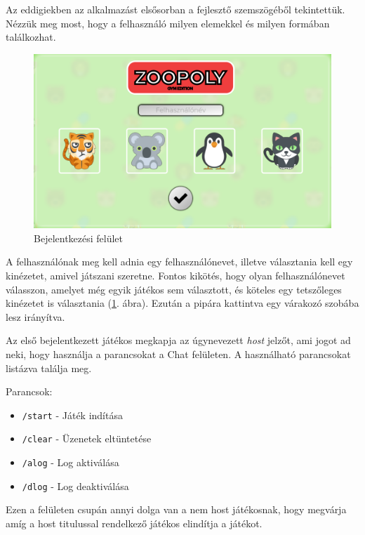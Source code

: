 
Az eddigiekben az alkalmazást elsősorban a fejlesztő szemszögéből tekintettük. Nézzük meg most, hogy a felhasználó milyen elemekkel és milyen formában találkozhat.


\begin{figure}[h!]
\centering
\includegraphics[width=\textwidth]{images/a5187162fb81495697aab2f5f49d6bd0.png}
\caption{Bejelentkezési felület}
\label{fig:login}
\end{figure}

A felhasználónak meg kell adnia egy felhasználónevet, illetve választania kell egy kinézetet, amivel játszani szeretne. Fontos kikötés, hogy olyan felhasználónevet válasszon, amelyet még egyik játékos sem választott, és köteles egy tetszőleges kinézetet is választania (\ref{fig:login}. ábra). Ezután a pipára kattintva egy várakozó szobába lesz irányítva.


Az első bejelentkezett játékos megkapja az úgynevezett \textit{host} jelzőt, ami jogot ad neki, hogy használja a parancsokat a Chat felületen. A használható parancsokat listázva találja meg.

Parancsok:
\begin{itemize}
	\item \texttt{/start} - Játék indítása
	\item \texttt{/clear} - Üzenetek eltüntetése
	\item \texttt{/alog} - Log aktiválása
	\item \texttt{/dlog} - Log deaktiválása
\end{itemize}
Ezen a felületen csupán annyi dolga van a nem host játékosnak, hogy megvárja amíg a host titulussal rendelkező játékos elindítja a játékot.

